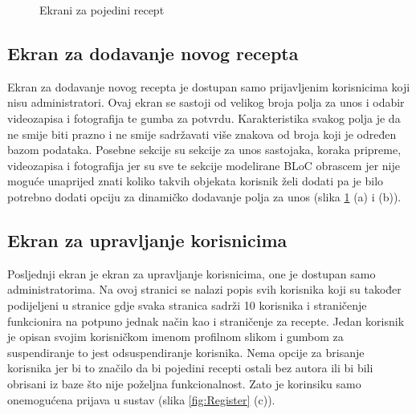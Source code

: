 \documentclass[times, utf8, zavrsni]{fer}
\begin{document}
\begin{figure}[h]
      \caption{Ekrani za pojedini recept}
      \label{fig:Single recipe}
\end{figure}

\subsection{Ekran za dodavanje novog recepta}
Ekran za dodavanje novog recepta je dostupan samo prijavljenim korisnicima koji nisu administratori.
Ovaj ekran se sastoji od velikog broja polja za unos i odabir videozapisa i fotografija te gumba za potvrdu.
Karakteristika svakog polja je da ne smije biti prazno i ne smije sadržavati više znakova od broja koji
je određen bazom podataka. Posebne sekcije su sekcije za unos sastojaka, koraka pripreme, videozapisa i
fotografija jer su sve te sekcije modelirane BLoC obrascem jer nije moguće unaprijed znati koliko
takvih objekata korisnik želi dodati pa je bilo potrebno dodati opciju za dinamičko dodavanje
polja za unos (slika \ref{fig:Single recipe} (a) i (b)).

\subsection{Ekran za upravljanje korisnicima}
Posljednji ekran je ekran za upravljanje korisnicima, one je dostupan samo administratorima. Na ovoj stranici se
nalazi popis svih korisnika koji su također podijeljeni u stranice gdje svaka stranica sadrži 10 korisnika
i straničenje funkcionira na potpuno jednak način kao i straničenje za recepte.
Jedan korisnik je opisan svojim korisničkom imenom profilnom slikom i gumbom za suspendiranje to jest
odsuspendiranje korisnika. Nema opcije za brisanje korisnika jer bi to značilo da bi pojedini recepti
ostali bez autora ili bi bili obrisani iz baze što nije poželjna funkcionalnost. Zato je korinsiku
samo onemogućena prijava u sustav (slika \ref{fig:Register} (c)).
\end{document}
